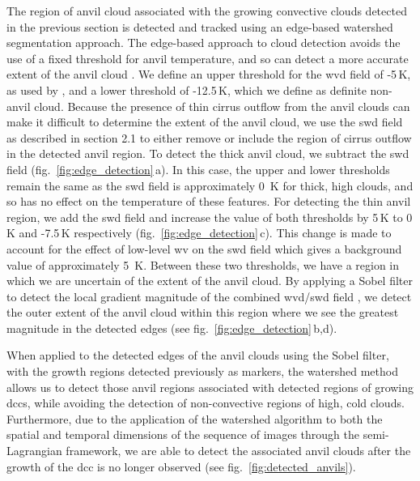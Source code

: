 The region of anvil cloud associated with the growing convective clouds detected in the previous section is detected and tracked using an edge-based watershed segmentation approach.
The edge-based approach to cloud detection avoids the use of a fixed threshold for anvil temperature, and so can detect a more accurate extent of the anvil cloud \citep{dim_alternative_2013}.
We define an upper threshold for the \acrshort{wvd} field of -5\,\unit{K}, as used by \citet{muller_role_2018}, and a lower threshold of -12.5\,\unit{K}, which we define as definite non-anvil cloud.
Because the presence of thin cirrus outflow from the anvil clouds can make it difficult to determine the extent of the anvil cloud, we use the \acrshort{swd} field as described in section 2.1 to either remove or include the region of cirrus outflow in the detected anvil region.
To detect the thick anvil cloud, we subtract the \acrshort{swd} field (fig.~\ref{fig:edge_detection}\,a).
In this case, the upper and lower thresholds remain the same as the \acrshort{swd} field is approximately 0~K for thick, high clouds, and so has no effect on the temperature of these features.
For detecting the thin anvil region, we add the \acrshort{swd} field and increase the value of both thresholds by 5\,\unit{K} to 0\,\unit{K} and -7.5\,\unit{K} respectively (fig.~\ref{fig:edge_detection}\,c).
This change is made to account for the effect of low-level \acrshort{wv} on the \acrshort{swd} field which gives a background value of approximately 5~K.
Between these two thresholds, we have a region in which we are uncertain of the extent of the anvil cloud.
By applying a Sobel filter to detect the local gradient magnitude of the combined \acrshort{wvd}/\acrshort{swd} field \citep{sobel_isotropic_2014}, we detect the outer extent of the anvil cloud within this region where we see the greatest magnitude in the detected edges (see fig.~\ref{fig:edge_detection}\,b,d).

When applied to the detected edges of the anvil clouds using the Sobel filter, with the growth regions detected previously as markers, the watershed method allows us to detect those anvil regions associated with detected regions of growing \acrshort{dcc}s, while avoiding the detection of non-convective regions of high, cold clouds.
Furthermore, due to the application of the watershed algorithm to both the spatial and temporal dimensions of the sequence of images through the semi-Lagrangian framework, we are able to detect the associated anvil clouds after the growth of the \acrshort{dcc} is no longer observed (see fig.~\ref{fig:detected_anvils}).

